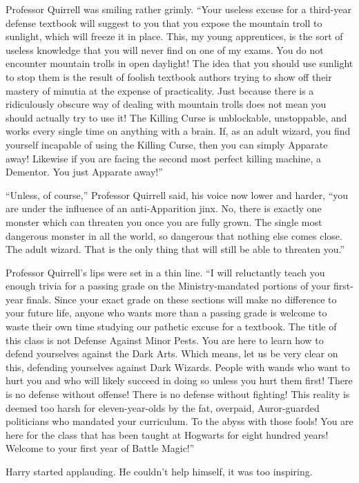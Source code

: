 Professor Quirrell was smiling rather grimly. “Your useless excuse for a third-year defense textbook will suggest to you that you expose the mountain troll to sunlight, which will freeze it in place. This, my young apprentices, is the sort of useless knowledge that you will never find on one of my exams. You do not encounter mountain trolls in open daylight! The idea that you should use sunlight to stop them is the result of foolish textbook authors trying to show off their mastery of minutia at the expense of practicality. Just because there is a ridiculously obscure way of dealing with mountain trolls does not mean you should actually try to use it! The Killing Curse is unblockable, unstoppable, and works every single time on anything with a brain. If, as an adult wizard, you find yourself incapable of using the Killing Curse, then you can simply Apparate away! Likewise if you are facing the second most perfect killing machine, a Dementor. You just Apparate away!”

“Unless, of course,” Professor Quirrell said, his voice now lower and harder, “you are under the influence of an anti-Apparition jinx. No, there is exactly one monster which can threaten you once you are fully grown. The single most dangerous monster in all the world, so dangerous that nothing else comes close. The adult wizard. That is the only thing that will still be able to threaten you.”

Professor Quirrell’s lips were set in a thin line. “I will reluctantly teach you enough trivia for a passing grade on the Ministry-mandated portions of your first-year finals. Since your exact grade on these sections will make no difference to your future life, anyone who wants more than a passing grade is welcome to waste their own time studying our pathetic excuse for a textbook. The title of this class is not Defense Against Minor Pests. You are here to learn how to defend yourselves against the Dark Arts. Which means, let us be very clear on this, defending yourselves against Dark Wizards. People with wands who want to hurt you and who will likely succeed in doing so unless you hurt them first! There is no defense without offense! There is no defense without fighting! This reality is deemed too harsh for eleven-year-olds by the fat, overpaid, Auror-guarded politicians who mandated your curriculum. To the abyss with those fools! You are here for the class that has been taught at Hogwarts for eight hundred years! Welcome to your first year of Battle Magic!”

Harry started applauding. He couldn’t help himself, it was too inspiring.

